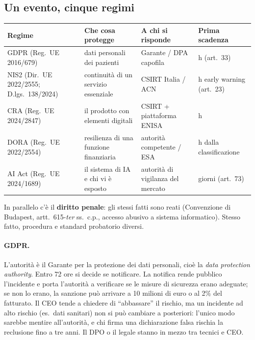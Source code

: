 \subsection{Un evento, cinque regimi}
\begin{center}
\small
\begin{tabularx}{\linewidth}{>{\raggedright\arraybackslash}p{2.6cm} X X >{\raggedright\arraybackslash}p{2.5cm}}
\toprule
\textbf{Regime} & \textbf{Che cosa protegge} & \textbf{A chi si risponde} & \textbf{Prima scadenza}\\
\midrule
GDPR (Reg.~UE 2016/679) & dati personali dei pazienti & Garante / DPA capofila & 72 h (art.~33)\\
NIS2 (Dir.~UE 2022/2555; D.lgs.~138/2024) & continuità di un servizio essenziale & CSIRT Italia / ACN
  & 24 h early warning (art.~23)\\
CRA (Reg.~UE 2024/2847) & il prodotto con elementi digitali & CSIRT + piattaforma ENISA & 24 h\\
DORA (Reg.~UE 2022/2554) & resilienza di una funzione finanziaria & autorità competente / ESA
  & 4 h dalla classificazione\\
AI Act (Reg.~UE 2024/1689) & il sistema di IA e chi vi è esposto & autorità di vigilanza del mercato
  & 15 giorni (art.~73)\\
\bottomrule
\end{tabularx}
\end{center}
In parallelo c'è il \textbf{diritto penale}: gli stessi fatti sono reati (Convenzione di Budapest,
artt.~615-\emph{ter} ss.\ c.p., accesso abusivo a sistema informatico). Stesso fatto, procedura e
standard probatorio diversi.

\paragraph{GDPR.} L'autorità è il Garante per la protezione dei dati personali, cioè la \emph{data
protection authority}. Entro 72 ore si decide se notificare. La notifica rende pubblico l'incidente
e porta l'autorità a verificare se le misure di sicurezza erano adeguate; se non lo erano, la
sanzione può arrivare a 10 milioni di euro o al 2\% del fatturato. Il CEO tende a chiedere di
``abbassare'' il rischio, ma un incidente ad alto rischio (es.\ dati sanitari) non si può cambiare a
posteriori: l'unico modo sarebbe mentire all'autorità, e chi firma una dichiarazione falsa rischia la
reclusione fino a tre anni. Il DPO o il legale stanno in mezzo tra tecnici e CEO.

